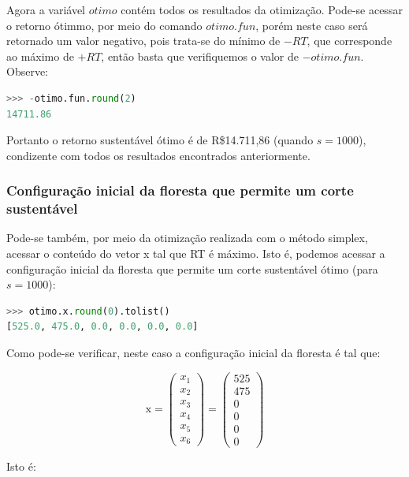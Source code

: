 \documentclass[a4paper, 12pt]{article}
\begin{document}
Agora a variável $otimo$ contém todos os resultados da otimização. Pode-se acessar o retorno ótimmo, por meio do comando $otimo.fun$, porém neste caso será retornado um valor negativo, pois trata-se do mínimo de $-RT$, que corresponde ao máximo de $+RT$, então basta que verifiquemos o valor de $-otimo.fun$. Observe:

\begin{lstlisting}[language=Python, caption=Simplex: retorno ótimo arredondando para 2 casas decimais, label=listing_simplex_retorno_otimo]
>>> -otimo.fun.round(2)
14711.86
\end{lstlisting}

Portanto o retorno sustentável ótimo é de R\$14.711,86 (quando $s=1000$), condizente com todos os resultados encontrados anteriormente.

\subsubsection{Configuração inicial da floresta que permite um corte sustentável}

Pode-se também, por meio da otimização realizada com o método simplex, acessar o conteúdo do vetor x tal que RT é máximo. Isto é, podemos acessar a configuração inicial da floresta que permite um corte sustentável ótimo (para $s=1000$):

\begin{lstlisting}[language=Python, caption=Simplex: vetor x, label=listing_simplex_vetor_x]
>>> otimo.x.round(0).tolist()
[525.0, 475.0, 0.0, 0.0, 0.0, 0.0]
\end{lstlisting}

Como pode-se verificar, neste caso a configuração inicial da floresta é tal que:

$$\mathrm{x}=\begin{pmatrix}
x_1\\
x_2\\
x_3\\
x_4\\
x_5\\
x_6
\end{pmatrix}=\begin{pmatrix}
525\\
475\\
0\\
0\\
0\\
0
\end{pmatrix}$$

Isto é:
\end{document}
